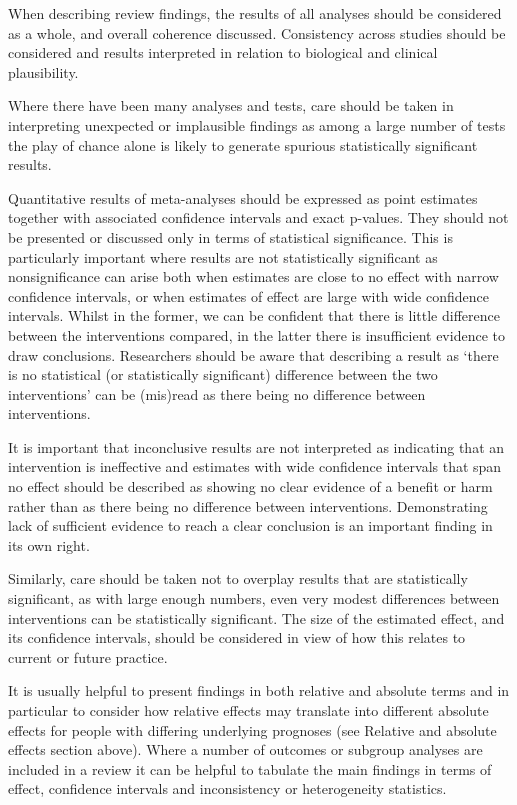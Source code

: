 \documentclass[
  10pt,
  a4paper,
  DIV=11,
  numbers=noendperiod]{scrreprt}
\begin{document}
When describing review findings, the results of all analyses should be
considered as a whole, and overall coherence discussed. Consistency
across studies should be considered and results interpreted in relation
to biological and clinical plausibility.

Where there have been many analyses and tests, care should be taken in
interpreting unexpected or implausible findings as among a large number
of tests the play of chance alone is likely to generate spurious
statistically significant results.

Quantitative results of meta-analyses should be expressed as point
estimates together with associated confidence intervals and exact
p-values. They should not be presented or discussed only in terms of
statistical significance. This is particularly important where results
are not statistically significant as nonsignificance can arise both when
estimates are close to no effect with narrow confidence intervals, or
when estimates of effect are large with wide confidence intervals.
Whilst in the former, we can be confident that there is little
difference between the interventions compared, in the latter there is
insufficient evidence to draw conclusions. Researchers should be aware
that describing a result as `there is no statistical (or statistically
significant) difference between the two interventions' can be (mis)read
as there being no difference between interventions.

It is important that inconclusive results are not interpreted as
indicating that an intervention is ineffective and estimates with wide
confidence intervals that span no effect should be described as showing
no clear evidence of a benefit or harm rather than as there being no
difference between interventions. Demonstrating lack of sufficient
evidence to reach a clear conclusion is an important finding in its own
right.

Similarly, care should be taken not to overplay results that are
statistically significant, as with large enough numbers, even very
modest differences between interventions can be statistically
significant. The size of the estimated effect, and its confidence
intervals, should be considered in view of how this relates to current
or future practice.

It is usually helpful to present findings in both relative and absolute
terms and in particular to consider how relative effects may translate
into different absolute effects for people with differing underlying
prognoses (see Relative and absolute effects section above). Where a
number of outcomes or subgroup analyses are included in a review it can
be helpful to tabulate the main findings in terms of effect, confidence
intervals and inconsistency or heterogeneity statistics.
\end{document}
